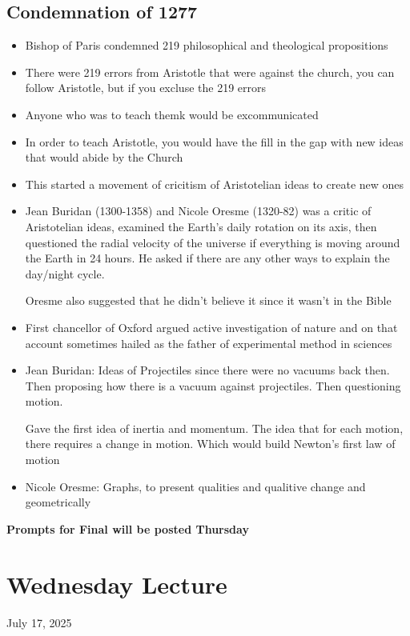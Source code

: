 \documentclass{article}
\begin{document}
\subsection{Condemnation of 1277}
\begin{itemize}
  \item Bishop of Paris condemned 219 philosophical and theological propositions
  \item There were 219 errors from Aristotle that were against the church, you
    can follow Aristotle, but if you excluse the 219 errors
  \item Anyone who was to teach themk would be excommunicated
  \item In order to teach Aristotle, you would have the fill in the gap with
    new ideas that would abide by the Church
  \item This started a movement of cricitism of Aristotelian ideas to create new ones
  \item Jean Buridan (1300-1358) and Nicole Oresme (1320-82) was a critic of Aristotelian ideas, examined
    the Earth's daily rotation on its axis, then questioned the radial velocity of the universe
    if everything is moving around the Earth in 24 hours. He asked if there are any
    other ways to explain the day/night cycle.

    Oresme also suggested that he didn't believe it since it
    wasn't in the Bible
  \item First chancellor of Oxford argued active investigation of nature
    and on that account sometimes hailed as the father of experimental method in sciences
  \item Jean Buridan: Ideas of Projectiles since there were no vacuums back then.
    Then proposing how there is a vacuum against projectiles. Then questioning motion.

    Gave the first idea of inertia and momentum. The idea that for each motion,
    there requires a change in motion. Which would build Newton's first law of motion
  \item Nicole Oresme: Graphs, to present qualities and qualitive change and geometrically
\end{itemize}

\textbf{Prompts for Final will be posted Thursday}

\section*{Wednesday Lecture}
July 17, 2025
\end{document}
